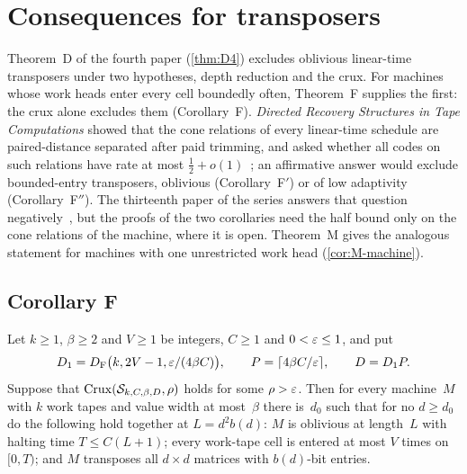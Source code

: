 \section{Consequences for transposers}\label{sec:transposers}

Theorem~D of the fourth paper (\cref{thm:D4}) excludes oblivious linear-time transposers under two hypotheses, depth
reduction and the crux. For machines whose work heads enter every cell boundedly often, Theorem~F supplies the first: the
crux alone excludes them (Corollary~F). \emph{Directed Recovery Structures in Tape Computations} showed that the cone
relations of every linear-time schedule are paired-distance separated after paid trimming, and asked whether all codes on
such relations have rate at most $\frac12+o(1)$~\cite[Question~9.1]{DirectedRecovery2026}; an affirmative answer would exclude
bounded-entry transposers, oblivious (Corollary~F$'$) or of low adaptivity (Corollary~F$''$). The thirteenth paper of the
series answers that question negatively~\cite{StorageCodes2026}, but the proofs of the two corollaries need the half bound
only on the cone relations of the machine, where it is open. Theorem~M gives the analogous
statement for machines with one unrestricted work head (\cref{cor:M-machine}).

\subsection{Corollary F}\label{sec:trans-F}

\begin{corollary}\label{cor:F}
\notformalized
Let $k\ge1$, $\beta\ge2$ and $V\ge1$ be integers, $C\ge1$ and $0<\varepsilon\le1$, and put
\[
  D_1=D_{\mathrm F}\bigl(k,2V-1,\varepsilon/(4\beta C)\bigr),\qquad P=\lceil4\beta C/\varepsilon\rceil,\qquad D=D_1P .
\]
Suppose that $\mathrm{Crux}(\mathcal S_{k,C,\beta,D},\rho)$ holds for some $\rho>\varepsilon$. Then for every machine~$M$ with $k$ work
tapes and value width at most~$\beta$ there is~$d_0$ such that for no $d\ge d_0$ do the following hold together at
$L=d^2b(d)$: $M$ is oblivious at length~$L$ with halting time $T\le C(L+1)$; every work-tape cell is entered at most $V$
times on $[0,T)$; and $M$ transposes all $d\times d$ matrices with $b(d)$-bit entries.
\end{corollary}


